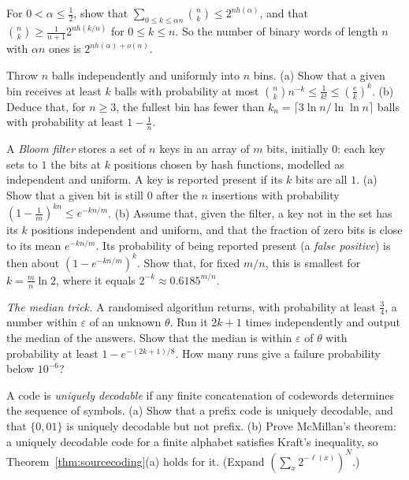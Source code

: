 \begin{exercise}[$\star\star$]\label{ex:entropybinom}
For $0<\alpha\le\frac12$, show that $\sum_{0\le k\le\alpha n}\binom nk\le2^{nh(\alpha)}$, and that $\binom nk\ge\frac1{n+1}2^{nh(k/n)}$ for $0\le k\le n$. So the number of
binary words of length $n$ with $\alpha n$ ones is $2^{nh(\alpha)+o(n)}$.
\end{exercise}

\begin{exercise}[$\star\star$]\label{ex:ballsbins}
Throw $n$ balls independently and uniformly into $n$ bins. (a) Show that a given bin receives at least $k$ balls with
probability at most $\binom nkn^{-k}\le\frac1{k!}\le(\frac ek)^k$. (b) Deduce that, for $n\ge3$, the fullest bin has fewer than
$k_n=\lceil3\ln n/\ln\ln n\rceil$ balls with probability at least $1-\frac1n$.
\end{exercise}

\begin{exercise}[$\star\star$]\label{ex:bloom}
A \emph{Bloom filter} stores a set of $n$ keys in an array of $m$ bits, initially $0$: each key sets to $1$ the bits at $k$
positions chosen by hash functions, modelled as independent and uniform. A key is reported present if its $k$ bits
are all $1$. (a) Show that a given bit is still $0$ after the $n$ insertions with probability $(1-\frac1m)^{kn}\le e^{-kn/m}$. (b) Assume that,
given the filter, a key not in the set has its $k$ positions independent and uniform, and that the fraction of zero bits is
close to its mean $e^{-kn/m}$. Its probability of being reported present (a \emph{false positive}) is then about
$(1-e^{-kn/m})^k$. Show that, for fixed $m/n$, this is smallest for $k=\frac mn\ln2$, where it equals $2^{-k}\approx0.6185^{m/n}$.
\end{exercise}

\begin{exercise}[$\star\star$]\label{ex:median}
\emph{The median trick.} A randomised algorithm returns, with probability at least $\frac34$, a number within $\varepsilon$ of an unknown
$\theta$. Run it $2k+1$ times independently and output the median of the answers. Show that the median is within $\varepsilon$ of $\theta$ with
probability at least $1-e^{-(2k+1)/8}$. How many runs give a failure probability below $10^{-6}$?
\end{exercise}

\begin{exercise}[$\star\star$]\label{ex:mcmillan}
A code is \emph{uniquely decodable} if any finite concatenation of codewords determines the sequence of symbols. (a) Show
that a prefix code is uniquely decodable, and that $\{0,01\}$ is uniquely decodable but not prefix. (b) Prove McMillan's
theorem: a uniquely decodable code for a finite alphabet satisfies Kraft's inequality, so Theorem~\ref{thm:sourcecoding}(a) holds for
it. (Expand $(\sum_x2^{-\ell(x)})^N$.)
\end{exercise}

